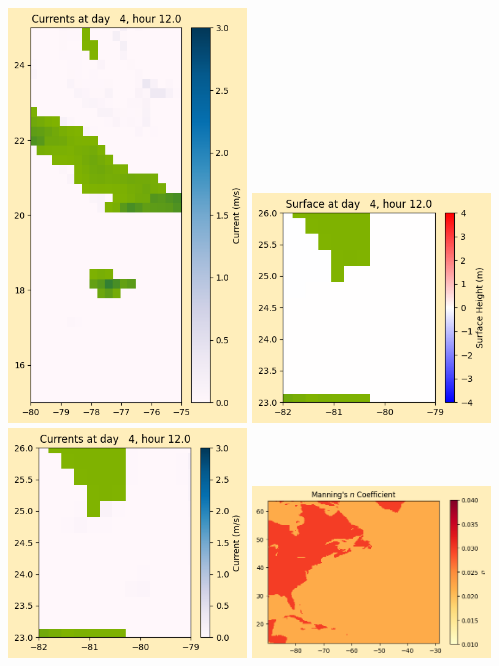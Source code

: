 \documentclass[11pt]{article}
\begin{document}
\includegraphics[width=0.475\textwidth]{frame0030fig1008.png}
\vskip 10pt 
\includegraphics[width=0.475\textwidth]{frame0030fig1009.png}
\includegraphics[width=0.475\textwidth]{frame0030fig1010.png}
\vskip 10pt 
\includegraphics[width=0.475\textwidth]{frame0030fig1011.png}
\end{document}
